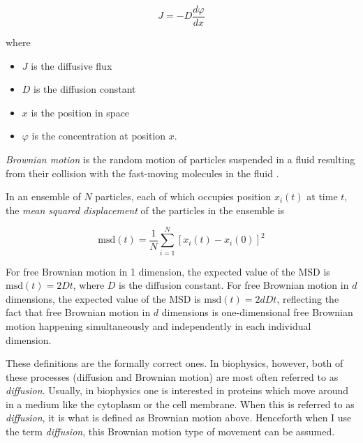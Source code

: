\documentclass[12pt,]{book}
\providecommand{\tightlist}{%
  \setlength{\itemsep}{0pt}\setlength{\parskip}{0pt}}
\theoremstyle{definition}
\theoremstyle{definition}
\theoremstyle{definition}
\theoremstyle{remark}
\let\BeginKnitrBlock\begin \let\EndKnitrBlock\end
\begin{document}
\begin{equation}
J = -D\frac{d\varphi}{dx}
\label{eq:ficksfirst}
\end{equation}

where

\begin{itemize}
\tightlist
\item
  \(J\) is the diffusive flux
\item
  \(D\) is the diffusion constant
\item
  \(x\) is the position in space
\item
  \(\varphi\) is the concentration at position \(x\).
\end{itemize}

\BeginKnitrBlock{definition}
\protect\hypertarget{def:unnamed-chunk-11}{}{\label{def:unnamed-chunk-11}
}\emph{Brownian motion} is the random motion of particles suspended in a
fluid resulting from their collision with the fast-moving molecules in
the fluid \citep{Brownian}.
\EndKnitrBlock{definition}

\BeginKnitrBlock{definition}
\protect\hypertarget{def:unnamed-chunk-12}{}{\label{def:unnamed-chunk-12}
}In an ensemble of \(N\) particles, each of which occupies position
\(x_i(t)\) at time \(t\), the \emph{mean squared displacement} of the
particles in the ensemble is

\begin{equation}
\text{msd}(t) = \frac{1}{N}\sum_{i = 1}^N [x_i(t) - x_i(0)]^2
\label{eq:msd}
\end{equation}
\EndKnitrBlock{definition}

For free Brownian motion in 1 dimension, the expected value of the MSD
is \(\text{msd}(t) = 2Dt\), where \(D\) is the diffusion constant. For
free Brownian motion in \(d\) dimensions, the expected value of the MSD
is \(\text{msd}(t) = 2dDt\), reflecting the fact that free Brownian
motion in \(d\) dimensions is one-dimensional free Brownian motion
happening simultaneously and independently in each individual dimension.

These definitions are the formally correct ones. In biophysics, however,
both of these processes (diffusion and Brownian motion) are most often
referred to as \emph{diffusion}. Usually, in biophysics one is
interested in proteins which move around in a medium like the cytoplasm
or the cell membrane. When this is referred to as \emph{diffusion}, it
is what is defined as Brownian motion above. Henceforth when I use the
term \emph{diffusion}, this Brownian motion type of movement can be
assumed.
\end{document}
